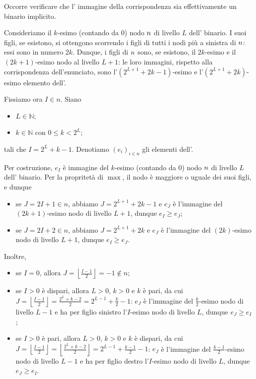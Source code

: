 \Proof Occorre verificare che l' immagine della corrispondenza
sia effettivamente un  binario implicito.
\par Consideriamo il $k$-esimo (contando da $0$) nodo $n$ di livello $L$
dell' binario. I suoi figli, se esistono, si ottengono scorrendo i
figli di tutti i nodi pi\`u a sinistra di $n$: essi sono in numero $2k$.
Dunque, i figli di $n$ sono, se esistono, il $2k$-esimo e il
$(2k + 1)$-esimo nodo al livello $L + 1$: le loro immagini, rispetto alla
corrispondenza dell'enunciato, sono
l'$(2^{L + 1} + 2k - 1)$-esimo
e
l'$(2^{L + 1} + 2k)$-esimo elemento dell'.
\par Fissiamo ora $I \in n$. Siano
\begin{itemize}
  \item $L \in \mathbb{N}$;
  \item $k \in \mathbb{N}$ con $0 \leq k < 2^L$;
\end{itemize}
tali che $I = 2^L + k - 1$.
Denotiamo $(e_i)_{i \in n}$ gli elementi dell'.
\par Per costruzione, $e_I$ \`e immagine del $k$-esimo (contando da $0$) nodo
$n$ di livello $L$ dell' binario. Per la propritet\`a di
 $\max$, il nodo \`e maggiore o uguale dei suoi figli, e dunque
\begin{itemize}
  \item se $J = 2I + 1 \in n$, abbiamo $J = 2^{L + 1} + 2k - 1$ e $e_J$ \`e
    l'immagine del $(2k + 1)$-esimo nodo di livello $L + 1$, dunque
    $e_I \geq e_J$;
  \item se $J = 2I + 2 \in n$, abbiamo $J = 2^{L + 1} + 2k$ e $e_J$ \`e
    l'immagine del $(2k)$-esimo nodo di livello $L + 1$, dunque
    $e_I \geq e_J$.
\end{itemize}
\par Inoltre,
\begin{itemize}
  \item se $I = 0$, allora
    $J = \left \lfloor \frac{I - 1}{2} \right \rfloor = - 1 \notin n$;
  \item se $I > 0$ \`e dispari, allora $L > 0$, $k > 0$ e $k$ \`e pari, da cui
    $J = \left \lfloor \frac{I - 1}{2} \right \rfloor
    = \frac{2^L + k - 2}{2} = 2^{L - 1} + \frac{k}{2} - 1$: $e_J$ \`e l'immagine
    del $\frac{k}{2}$-esimo nodo di livello $L - 1$ e ha per figlio sinistro
    l'$I$-esimo nodo di livello $L$, dunque $e_J \geq e_I$;
  \item se $I > 0$ \`e pari, allora $L > 0$, $k > 0$ e $k$ \`e dispari, da cui
    $J = \left \lfloor \frac{I - 1}{2} \right \rfloor
    = \left \lfloor \frac{2^L + k - 2}{2} \right \rfloor
    = 2^{L - 1} + \frac{k - 1}{2} - 1$: $e_J$ \`e
    l'immagine del $\frac{k - 1}{2}$-esimo nodo di
    livello $L - 1$ e ha per figlio destro l'$I$-esimo nodo di livello $L$,
    dunque $e_J \geq e_I$. \EndProof
\end{itemize}
